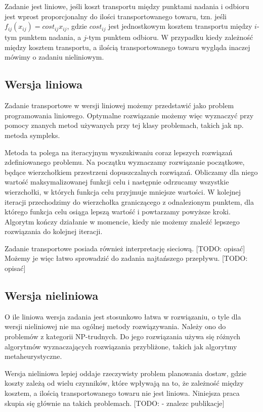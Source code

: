 Zadanie jest liniowe, jeśli koszt transportu między punktami nadania i odbioru jest wprost proporcjonalny 
do ilości transportowanego towaru, tzn. jeśli $f_{ij}(x_{ij}) = cost_{ij} x_{ij}$, gdzie $cost_{ij}$ jest jednostkowym kosztem transportu 
między $i$-tym punktem nadania, a $j$-tym punktem odbioru. W przypadku kiedy zależność między kosztem transportu, a ilością transportowanego 
towaru wygląda inaczej mówimy o zadaniu nieliniowym.

\subsection{Wersja liniowa}
Zadanie transportowe w wersji liniowej możemy przedstawić jako problem programowania liniowego. Optymalne rozwiązanie możemy więc wyznaczyć 
przy pomocy znanych metod używanych przy tej klasy problemach, takich jak np. metoda sympleks\cite{TP-SYMPLEX-BOOK}. 

Metoda ta polega na 
iteracyjnym wyszukiwaniu coraz lepszych rozwiązań zdefiniowanego problemu. Na początku wyznaczamy rozwiązanie początkowe, będące wierzchołkiem 
przestrzeni dopuszczalnych rozwiązań. Obliczamy dla niego wartość maksymalizowanej funkcji celu i następnie odrzucamy wszystkie 
wierzchołki, w których funkcja celu przyjmuje mniejsze wartości. W kolejnej iteracji przechodzimy do wierzchołka graniczącego z odnalezionym 
punktem, dla którego funkcja celu osiąga lepszą wartość i powtarzamy powyższe kroki. Algorytm kończy działanie w momencie, kiedy nie możemy 
znaleźć lepszego rozwiązania do kolejnej iteracji.

Zadanie transportowe posiada również interpretację sieciową. [TODO: opisać] Możemy je więc łatwo sprowadzić do zadania najtańszego przepływu. 
[TODO: opisać]

\subsection{Wersja nieliniowa}
O ile liniowa wersja zadania jest stosunkowo łatwa w rozwiązaniu, o tyle dla wersji nieliniowej nie ma ogólnej metody rozwiązywania. Należy 
ono do problemów z kategorii NP-trudnych. Do jego rozwiązania używa się różnych algorytmów wyznaczających 
rozwiązania przybliżone, takich jak algorytmy metaheurystyczne. 

Wersja nieliniowa lepiej oddaje rzeczywisty problem planowania dostaw, gdzie koszty zależą od wielu czynników, które wpływają na to, 
że zależność między kosztem, a ilością transportowanego towaru nie jest liniowa. Niniejsza praca skupia się głównie na takich problemach.
[TODO: - znalezc publikacje]
